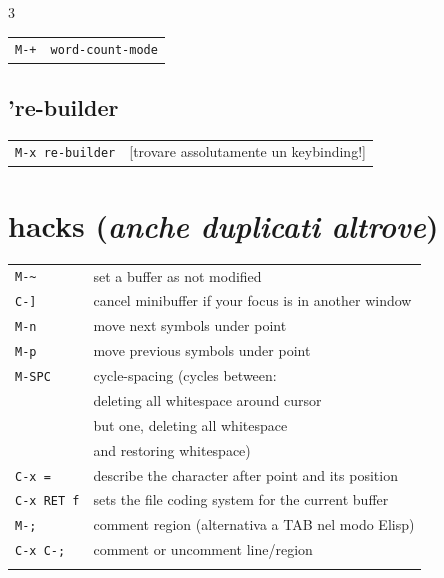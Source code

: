 \documentclass[11pt,landscape,a4paper]{article}
\begin{document}
\begin{multicols}{3}
\begin{tabular}{@{}ll@{}}
	{\color{cgreen}\verb|M-+|}  & \verb|word-count-mode|\\
\end{tabular}

\subsection{'re-builder}

\begin{tabular}{@{}ll@{}}
	{\color{cgreen}\verb|M-x re-builder|} & [trovare assolutamente un keybinding!]\\
\end{tabular}



\vfill\null
\columnbreak

\section{hacks (\textit{anche duplicati altrove})}

\begin{tabular}{@{}ll@{}}
	{\verb|M-~|} 		& set a buffer as not modified\\ %
	{\verb|C-]|} 			& cancel minibuffer if your focus is in another window\\ %
	{\color{cgreen}\verb|M-n|} 		& move next symbols under point\\
	{\color{cgreen}\verb|M-p|} 		& move previous symbols under point\\
	{\color{cblue}\verb|M-SPC|} & cycle-spacing 
	(cycles between: \\ & deleting all whitespace around cursor \\ & but one, deleting all whitespace\\ & and restoring whitespace)\\
	{\verb|C-x =|} 						& describe the character after point and its position\\ 
	{\verb|C-x RET f|}				& sets the file coding system for the current buffer\\
	{\verb|M-;|} 						& comment region (alternativa a TAB nel modo Elisp)\\ 
	{\verb|C-x C-;|} 						& comment or uncomment line/region\\ 
	\\
\end{tabular}


\end{multicols}
\end{document}
